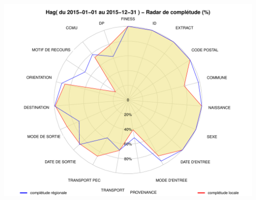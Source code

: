 \documentclass[]{article}
\begin{document}
\includegraphics{completude_files/figure-latex/finess-6.pdf}
\end{document}
